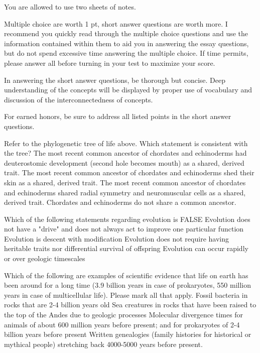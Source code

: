 You are allowed to use two sheets of notes. 

Multiple choice are worth 1 pt, short answer questions are worth more. I recommend you quickly read through the multiple choice questions and use the information contained within them to aid you in answering the essay questions, but do not spend excessive time answering the multiple choice. If time permits, please answer all before turning in your test to maximize your score.

In answering the short answer questions, be thorough but concise. Deep understanding of the concepts will be displayed by proper use of vocabulary and discussion of the interconnectedness of concepts.

For earned honors, be sure to address all listed points in the short answer questions.




Refer to the phylogenetic tree of life above. Which statement is consistent with the tree? 
The most recent common ancestor of chordates and echinoderms had deuterostomic development (second hole becomes mouth) as a shared, derived trait.
The most recent common ancestor of chordates and echinoderms shed their skin as a shared, derived trait.
The most recent common ancestor of chordates and echinoderms shared radial symmetry and neuromuscular cells as a shared, derived trait. 
Chordates and echinoderms do not share a common ancestor. 



Which of the following statements regarding evolution is FALSE
Evolution does not have a "drive" and does not always act to improve one particular function
Evolution is descent with modification
Evolution does not require having heritable traits nor differential survival of offspring
Evolution can occur rapidly or over geologic timescales




Which of the following are examples of scientific evidence that life on earth has been around for a long time (3.9 billion years in case of prokaryotes, 550 million years in case of multicellular life). Please mark all that apply. 
Fossil bacteria in rocks that are 2-4 billion years old
Sea creatures in rocks that have been raised to the top of the Andes due to geologic processes
Molecular divergence times for animals of about 600 million years before present; and for prokaryotes of 2-4 billion years before present
Written genealogies (family histories for historical or mythical people) stretching back 4000-5000 years before present. 




